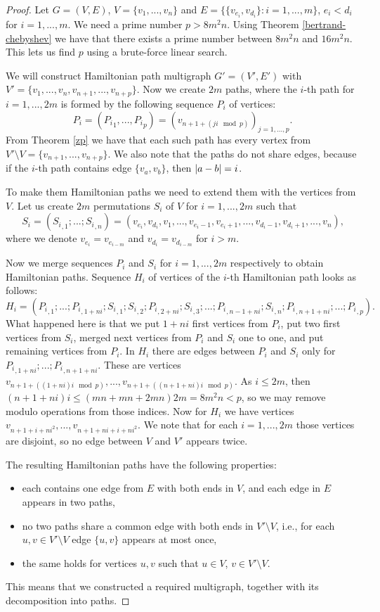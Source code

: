 \begin{proof}
Let $G = (V,E)$, $V = \{v_1, ..., v_n\}$ and $E = \{\{v_{e_i}, v_{d_i}\}: i = 1, ..., m\}$,
$e_i < d_i$ for $i=1,...,m$.
We need a prime number $p > 8m^2 n$.
Using Theorem \ref{bertrand-chebyshev} we have that there exists a prime number between $8m^2n$ and $16m^2 n$.
This lets us find $p$ using a brute-force linear search.

\sloppy
We will construct Hamiltonian path multigraph $G' = (V',E')$
with $V' = \{v_1, ..., v_n, v_{n+1}, ..., v_{n+p}\}$. 
Now we create $2m$ paths, where the $i$-th path for $i=1,...,2m$
is formed by the following sequence $P_i$ of vertices:
$$ P_i = ({P_i}_1, ..., {P_i}_p) =  (v_{n+1+(ji \mod p)})_{j=1,...,p} \text{.}$$ 
From Theorem \ref{zp} we have that each such path has every vertex from
$V' \setminus V = \{v_{n+1}, ..., v_{n+p}\}$.
We also note that the paths do not share edges,
because if the $i$-th path contains edge $\{v_a, v_b\}$, then $\left\vert a-b \right\vert = i$.

To make them Hamiltonian paths we need to extend them with the vertices from $V$.
Let us create $2m$ permutations $S_i$ of $V$ for $i=1,...,2m$ such that
$$S_i = ({S_i}_{,1}; ...; {S_i}_{,n}) =
(v_{e_i}, v_{d_i}, v_1, ..., v_{e_i-1}, v_{e_i+1}, ..., v_{d_i-1}, v_{d_i+1}, ..., v_n)\text{,}$$
where we denote $v_{e_i} = v_{e_{i-m}}$ and $v_{d_i} = v_{d_{i-m}}$ for $i>m$. 

Now we merge sequences $P_i$ and $S_i$ for $i=1,...,2m$ respectively to obtain Hamiltonian paths.
Sequence $H_i$ of vertices of the $i$-th Hamiltonian path looks as follows:
$$H_i = ({P_i}_{,1}; ...; {P_i}_{,1+ni}; {S_i}_{,1}; {S_i}_{,2}; {P_i}_{,2+ni}; {S_i}_{,3}; ...;
{P_i}_{,n-1+ni}; {S_i}_{,n}; {P_i}_{,n+1+ni}; ...; {P_i}_{,p}) \text{.}$$
What happened here is that we put $1+ni$ first vertices from $P_i$,
put two first vertices from $S_i$, merged next vertices from $P_i$ and $S_i$ one to one,
and put remaining vertices from $P_i$.
In $H_i$ there are edges between $P_i$ and $S_i$ only for ${P_i}_{,1+ni}; ...; {P_i}_{,n+1+ni}$.
These are vertices $v_{n+1+((1+ni)i \mod p)}, ..., v_{n+1+((n+1+ni)i \mod p)} $.
As $i \leq 2m$, then $(n+1+ni)i \leq (mn+mn+2mn)2m = 8m^2 n < p$,
so we may remove modulo operations from those indices.
Now for $H_i$ we have vertices $v_{n+1+i+ni^2}, ..., v_{n+1+ni+i+ni^2}$.
We note that for each $i=1,...,2m$ those vertices are disjoint, so no edge between $V$ and $V'$ appears twice.

The resulting Hamiltonian paths have the following properties:
\begin{itemize}
\item each contains one edge from $E$ with both ends in $V$,
  and each edge in $E$ appears in two paths,
\item no two paths share a common edge with both ends in $V' \setminus V$,
  i.e., for each $u,v \in V' \setminus V$ edge $\{u,v\}$ appears at most once,
\item the same holds for vertices $u,v$ such that $u \in V$, $v \in V' \setminus V$.
\end{itemize}
This means that we constructed a required multigraph, together with its decomposition into paths.
\end{proof}

